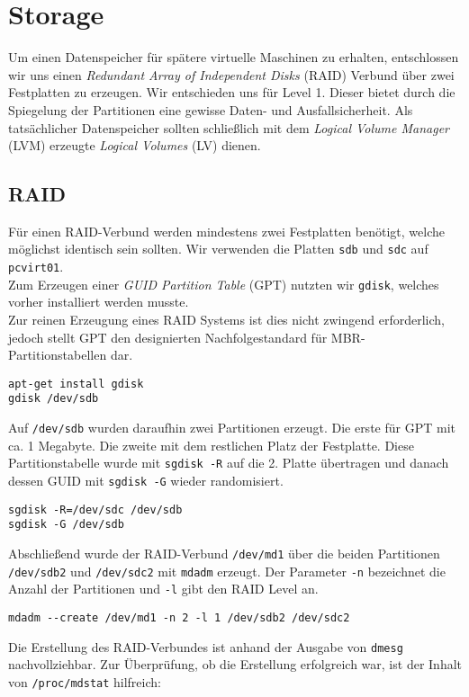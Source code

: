 \chapter{Storage}
Um einen Datenspeicher für spätere virtuelle Maschinen zu erhalten, entschlossen wir uns einen \emph{Redundant Array of Independent Disks} (RAID) Verbund über zwei Festplatten zu erzeugen. Wir entschieden uns für Level 1. Dieser bietet durch die Spiegelung der Partitionen eine gewisse Daten- und Ausfallsicherheit. Als tatsächlicher Datenspeicher sollten schließlich mit dem \emph{Logical Volume Manager} (LVM) erzeugte \emph{Logical Volumes} (LV) dienen. 
\section{RAID}
\label{raid}
Für einen RAID-Verbund werden mindestens zwei Festplatten benötigt, welche möglichst identisch sein sollten. Wir verwenden die Platten \verb#sdb# und \verb#sdc# auf \verb#pcvirt01#. \\
Zum Erzeugen einer \emph{GUID Partition Table} (GPT) nutzten wir \verb#gdisk#, welches vorher installiert werden musste. \\ 
Zur reinen Erzeugung eines RAID Systems ist dies nicht zwingend erforderlich, jedoch stellt GPT den designierten Nachfolgestandard für MBR-Partitionstabellen dar. 
\begin{verbatim}
apt-get install gdisk
gdisk /dev/sdb
\end{verbatim}
Auf \verb#/dev/sdb# wurden daraufhin zwei Partitionen erzeugt. Die erste für GPT mit ca. 1 Megabyte. Die zweite mit dem restlichen Platz der Festplatte.
Diese Partitionstabelle wurde mit \verb#sgdisk -R# auf die 2. Platte übertragen und danach dessen GUID mit \verb#sgdisk -G# wieder randomisiert.
\begin{verbatim}
sgdisk -R=/dev/sdc /dev/sdb
sgdisk -G /dev/sdb
\end{verbatim}
Abschließend wurde der RAID-Verbund \verb#/dev/md1# über die beiden Partitionen \verb#/dev/sdb2# und \verb#/dev/sdc2# mit \verb#mdadm# erzeugt. Der Parameter \verb#-n# bezeichnet die Anzahl der Partitionen und \verb#-l# gibt den RAID Level an.
\begin{verbatim}
mdadm --create /dev/md1 -n 2 -l 1 /dev/sdb2 /dev/sdc2
\end{verbatim}
Die Erstellung des RAID-Verbundes ist anhand der Ausgabe von \verb#dmesg# nachvollziehbar. Zur Überprüfung, ob die Erstellung erfolgreich war, ist der Inhalt von \verb#/proc/mdstat# hilfreich: 

